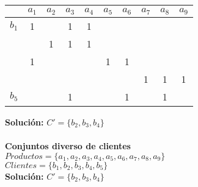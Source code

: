 \documentclass[11pt]{article}
\begin{document}
\begin{table}[h]
\centering
\begin{tabular}{c|c|c|c|c|c|c|c|c|c|}
\cline{2-10}
                                                    & $a_1$ & $a_2$ & $a_3$ & $a_4$ & $a_5$ & $a_6$ & $a_7$ & $a_8$ & $a_9$ \\ \hline
\multicolumn{1}{|c|}{$b_1$}                         & 1     &       & 1     & 1     &       &       &       &       &       \\ \hline
\rowcolor[HTML]{9AFF99}
\multicolumn{1}{|l|}{\cellcolor[HTML]{9AFF99}$b_2$} &       & 1     & 1     & 1     &       &       &       &       &       \\ \hline
\rowcolor[HTML]{9AFF99}
\multicolumn{1}{|l|}{\cellcolor[HTML]{9AFF99}$b_3$} & 1     &       &       &       & 1     & 1     &       &       &       \\ \hline
\rowcolor[HTML]{9AFF99}
\multicolumn{1}{|c|}{\cellcolor[HTML]{9AFF99}$b_4$} &       &       &       &       &       &       & 1     & 1     & 1     \\ \hline
\multicolumn{1}{|c|}{$b_5$}                         &       &       & 1     &       &       & 1     &       & 1     &       \\ \hline
\end{tabular}
\end{table}

\textbf{Solución: } $C' = \{ b_2, b_3, b_4 \}$ \\ \\
\textbf{Conjuntos diverso de clientes} \\
$Productos = \{a_1, a_2, a_3, a_4, a_5, a_6, a_7, a_8, a_9\}$ \\
$Clientes = \{b_1, b_2, b_3, b_4, b_5 \}$ \\
\textbf{Solución: } $C' = \{ b_2, b_3, b_4 \}$
\end{document}
